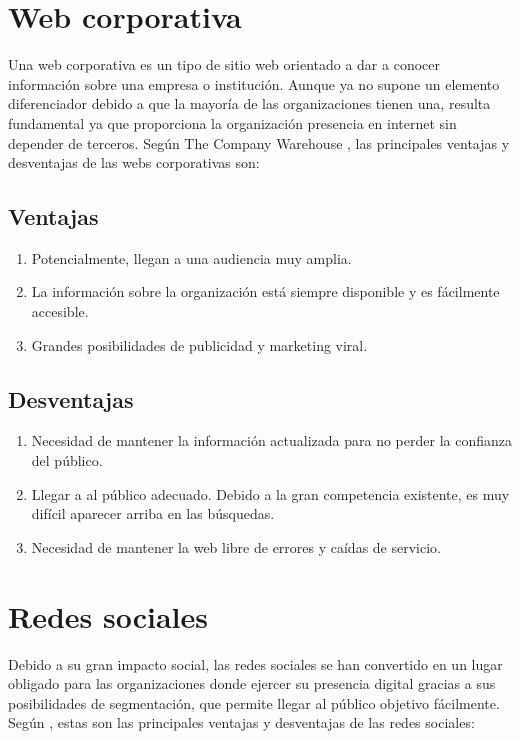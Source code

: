 \section{Web corporativa}
Una web corporativa es un tipo de sitio web orientado a dar a conocer información sobre una empresa o institución. Aunque ya no supone un elemento diferenciador debido a que la mayoría de las organizaciones tienen una, resulta fundamental ya que proporciona la organización presencia en internet sin depender de terceros. Según The Company Warehouse \cite{web_corporativa}, las principales ventajas y desventajas de las webs corporativas son:
\subsection*{Ventajas}
\begin{enumerate}
    \item Potencialmente, llegan a una audiencia muy amplia.
    \item La información sobre la organización está siempre disponible y es fácilmente accesible.
    \item Grandes posibilidades de publicidad y marketing viral.
\end{enumerate}
\subsection*{Desventajas}
\begin{enumerate}
    \item Necesidad de mantener la información actualizada para no perder la confianza del público.
    \item Llegar a al público adecuado. Debido a la gran competencia existente, es muy difícil aparecer arriba en las búsquedas.
    \item Necesidad de mantener la web libre de errores y caídas de servicio.
\end{enumerate}

\section{Redes sociales}
Debido a su gran impacto social, las redes sociales se han convertido en un lugar obligado para las organizaciones donde ejercer su presencia digital gracias a sus posibilidades de segmentación, que permite llegar al público objetivo fácilmente. Según \cite{nadaraja2013socialmediamarketing}, estas son las principales ventajas y desventajas de las redes sociales:

